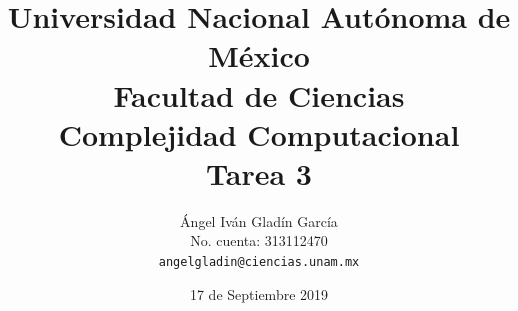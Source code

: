 \documentclass[11pt,letterpaper]{report}
\begin{document}
\title{
        Universidad Nacional Autónoma de México\\
        Facultad de Ciencias\\
        Complejidad Computacional\\
    \vspace{1cm}
    \large
        \textbf{Tarea 3}\\
}
\author{
    Ángel Iván Gladín García\\
    No. cuenta: 313112470\\
    \texttt{angelgladin@ciencias.unam.mx}
}
\date{17 de Septiembre 2019}
\maketitle

\newtheorem{theorem}{Teorema}
\newtheorem{example}{Ejemplo}
\newtheorem{corollary}{Corolario}
\newtheorem{lemma}{Lemma}
\newtheorem{definition}{Definicion}
\newtheorem{prop}{Proposicion}
\end{document}
